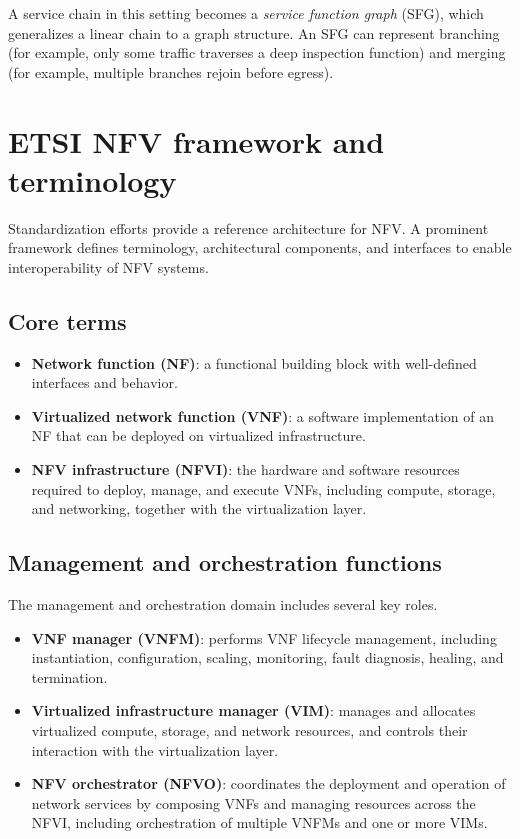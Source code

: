 \documentclass[11pt,a4paper,openany]{report}
\begin{document}
A service chain in this setting becomes a \emph{service function graph} (SFG), which generalizes a linear chain to a graph structure. An SFG can represent branching (for example, only some traffic traverses a deep inspection function) and merging (for example, multiple branches rejoin before egress).

\section{ETSI NFV framework and terminology}

Standardization efforts provide a reference architecture for NFV. A prominent framework defines terminology, architectural components, and interfaces to enable interoperability of NFV systems.

\subsection{Core terms}

\begin{itemize}
\item \textbf{Network function (NF)}: a functional building block with well-defined interfaces and behavior.
\item \textbf{Virtualized network function (VNF)}: a software implementation of an NF that can be deployed on virtualized infrastructure.
\item \textbf{NFV infrastructure (NFVI)}: the hardware and software resources required to deploy, manage, and execute VNFs, including compute, storage, and networking, together with the virtualization layer.
\end{itemize}

\subsection{Management and orchestration functions}

The management and orchestration domain includes several key roles.

\begin{itemize}
\item \textbf{VNF manager (VNFM)}: performs VNF lifecycle management, including instantiation, configuration, scaling, monitoring, fault diagnosis, healing, and termination.
\item \textbf{Virtualized infrastructure manager (VIM)}: manages and allocates virtualized compute, storage, and network resources, and controls their interaction with the virtualization layer.
\item \textbf{NFV orchestrator (NFVO)}: coordinates the deployment and operation of network services by composing VNFs and managing resources across the NFVI, including orchestration of multiple VNFMs and one or more VIMs.
\end{itemize}
\end{document}
